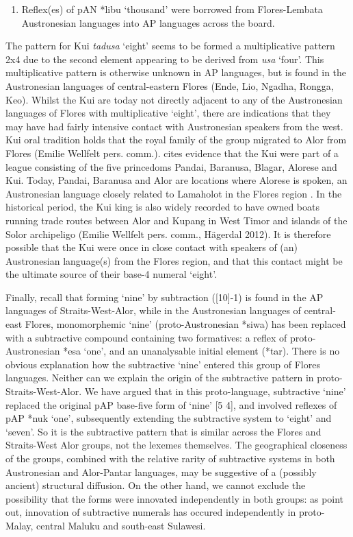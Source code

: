 {\begin{enumerate}
\item Reflex(es) of pAN *libu `thousand' were borrowed from Flores-Lembata Austronesian languages into AP languages across the board.


\end{enumerate}
  The pattern for Kui \textit{tadusa} `eight' seems to be formed a multiplicative pattern 2x4 due to the second element appearing to be derived from \textit{usa} `four'. This multiplicative pattern is otherwise unknown in AP languages, but is found in the Austronesian languages of central-eastern Flores (Ende, Lio, Ngadha, Rongga, Keo). Whilst the Kui are today not directly adjacent to any of the Austronesian languages of Flores with multiplicative `eight', there are indications that they may have had fairly intensive contact with Austronesian speakers from the west. Kui oral tradition holds that the royal family of the group migrated to Alor from Flores (Emilie Wellfelt pers. comm.). \citet[38, fn. 36]{Hagerdal2012} cites evidence that the Kui were part of a league consisting of the five princedoms Pandai, Baranusa, Blagar, Alorese and Kui. Today, Pandai, Baranusa and Alor are locations where Alorese is spoken, an Austronesian language closely related to Lamaholot in the Flores region \citep{Klamer2011,Klamer2012}. In the historical period, the Kui king is also widely recorded to have owned boats running trade routes between Alor and Kupang in West Timor and islands of the Solor archipeligo (Emilie Wellfelt pers. comm., H\"agerdal 2012). It is therefore possible that the Kui were once in close contact with speakers of (an) Austronesian language(s) from the Flores region, and that this contact might be the ultimate source of their base-4 numeral `eight'.

Finally, recall that forming `nine' by subtraction ([10]-1) is found in the AP languages of Straits-West-Alor, while in the Austronesian languages of central-east Flores, monomorphemic `nine' (proto-Austronesian *siwa) has been replaced with a subtractive compound containing two formatives: a reflex of proto-Austronesian *esa `one', and an unanalysable initial element (*tar). There is no obvious explanation how the subtractive `nine' entered this group of Flores languages. Neither can we explain the origin of the subtractive pattern in proto-Straits-West-Alor. We have argued that in this proto-language, subtractive `nine' replaced the original pAP base-five form of `nine' [5 4], and involved reflexes of pAP *nuk `one', subsequently extending the subtractive system to `eight' and `seven'. So it is the subtractive pattern that is similar across the Flores and Straits-West Alor groups, not the lexemes themselves. The geographical closeness of the groups, combined with the relative rarity of subtractive systems in both Austronesian and Alor-Pantar languages, may be suggestive of a (possibly ancient) structural diffusion. On the other hand, we cannot exclude the possibility that the forms were innovated independently in both groups: as \citet{SchapperEtAl2013} point out, innovation of subtractive numerals has occured independently in proto-Malay, central Maluku and south-east Sulawesi.

}
